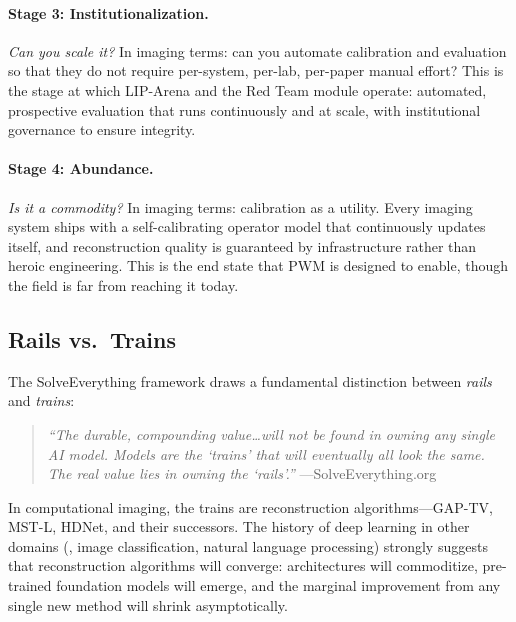 \paragraph{Stage 3: Institutionalization.}
\textit{Can you scale it?}
In imaging terms: can you automate calibration and evaluation so that
they do not require per-system, per-lab, per-paper manual effort?
This is the stage at which LIP-Arena and the Red Team module operate:
automated, prospective evaluation that runs continuously and at scale,
with institutional governance to ensure integrity.

\paragraph{Stage 4: Abundance.}
\textit{Is it a commodity?}
In imaging terms: calibration as a utility.
Every imaging system ships with a self-calibrating operator model that
continuously updates itself, and reconstruction quality is guaranteed by
infrastructure rather than heroic engineering.
This is the end state that PWM is designed to enable, though the field
is far from reaching it today.


\subsection{Rails vs.\ Trains}
\label{sec:rails_trains}

The SolveEverything framework draws a fundamental distinction between
\emph{rails} and \emph{trains}:

\begin{quote}
\textit{``The durable, compounding value\ldots will not be found in
owning any single AI model.
Models are the `trains' that will eventually all look the same.
The real value lies in owning the `rails'.''}
\hfill---SolveEverything.org~\cite{wissner2026solveeverything}
\end{quote}

In computational imaging, the trains are reconstruction
algorithms---GAP-TV, MST-L, HDNet, and their successors.
The history of deep learning in other domains (\eg, image
classification, natural language processing) strongly suggests that
reconstruction algorithms will converge: architectures will
commoditize, pre-trained foundation models will emerge, and the
marginal improvement from any single new method will shrink
asymptotically.

